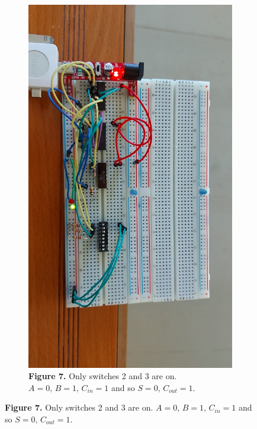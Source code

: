 \documentclass[a4paper]{article}
\begin{document}
\begin{figure}
     \centering
     \begin{subfigure}[b]{0.9\textwidth}
         \centering
          \includegraphics[angle=90, width=\textwidth]{23on.jpeg}
          \caption*{\textbf{Figure 7.} Only switches 2 and 3 are on. $A=0,\,B=1,\, C_{in} = 1$ and so $S=0,\,C_{out}=1$.\vspace{2em}}
         \label{fig:2on}
     \end{subfigure}
     \hfill

\end{figure}
\end{document}
